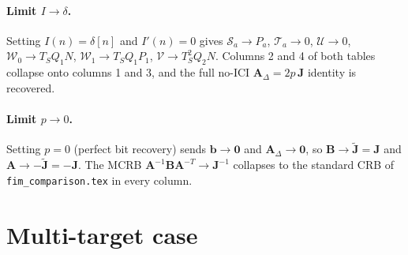 \documentclass[11pt]{article}
\begin{document}
\paragraph{Limit \(I \to \delta\).} Setting \(I(n) = \delta[n]\) and \(I'(n) = 0\) gives \(\mathcal{S}_a \to P_a\), \(\mathcal{T}_a \to 0\), \(\mathcal{U} \to 0\), \(\mathcal{W}_0 \to T_S Q_1 N\), \(\mathcal{W}_1 \to T_S Q_1 P_1\), \(\mathcal{V} \to T_S^2 Q_2 N\). Columns 2 and 4 of both tables collapse onto columns 1 and 3, and the full no-ICI \(\bm{A}_\Delta = 2p\, \bm{J}\) identity is recovered.

\paragraph{Limit \(p \to 0\).} Setting \(p = 0\) (perfect bit recovery) sends \(\bm{b} \to \bm{0}\) and \(\bm{A}_\Delta \to \bm{0}\), so \(\bm{B} \to \tilde{\bm{J}} = \bm{J}\) and \(\bm{A} \to -\tilde{\bm{J}} = -\bm{J}\). The MCRB \(\bm{A}^{-1}\bm{B}\bm{A}^{-T} \to \bm{J}^{-1}\) collapses to the standard CRB of \texttt{fim\_comparison.tex} in every column.

\section{Multi-target case}
\end{document}
